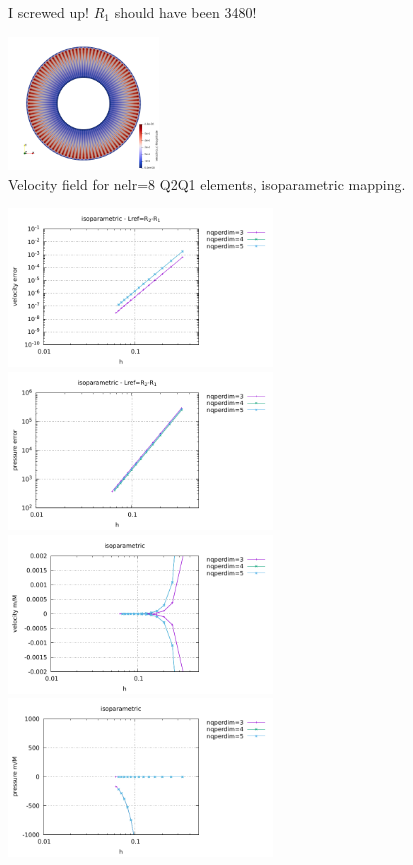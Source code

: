 I screwed up! $R_1$ should have been 3480!

\begin{center}
\includegraphics[width=4cm]{python_codes/fieldstone_133/results/bench3/vel}\\
{\captionfont  Velocity field for nelr=8 Q2Q1 elements, isoparametric mapping.}
\end{center}

\begin{center}
\includegraphics[width=7cm]{python_codes/fieldstone_133/results/bench3/ISO_Lref_R21/errors_v.pdf}
\includegraphics[width=7cm]{python_codes/fieldstone_133/results/bench3/ISO_Lref_R21/errors_p.pdf}\\
\includegraphics[width=7cm]{python_codes/fieldstone_133/results/bench3/ISO_Lref_R21/vel_stats.pdf}
\includegraphics[width=7cm]{python_codes/fieldstone_133/results/bench3/ISO_Lref_R21/press_stats.pdf}\\

\end{center}
